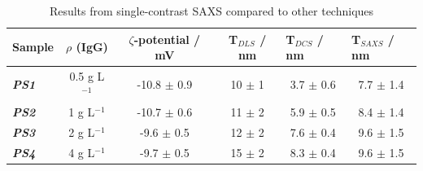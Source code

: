 \begin{table}[]
\centering
\caption{Results from single-contrast SAXS compared to other techniques}
\label{my-label}
\begin{tabular}{|l|c|c|c|c|c|}
\hline
\multicolumn{1}{|c|}{\textbf{Sample}} & \textbf{$\rho$ (IgG) } & \textbf{$\zeta$-potential / mV} & \textbf{T$_{DLS}$ / nm} & \multicolumn{1}{l|}{\textbf{T$_{DCS}$ / nm}} & \multicolumn{1}{l|}{\textbf{T$_{SAXS}$ / nm}} \\ \hline
\textit{\textbf{PS1}}                 & 0.5 g L$^{-1}$                      & -10.8 $\pm$ 0.9                  & 10 $\pm$ 1              & 3.7 $\pm$ 0.6                                & 7.7 $\pm$ 1.4                                 \\ \hline
\textit{\textbf{PS2}}                 & 1 g L$^{-1}$                        & -10.7 $\pm$ 0.6                  & 11 $\pm$ 2              & 5.9 $\pm$ 0.5                                & 8.4 $\pm$ 1.4                                 \\ \hline
\textit{\textbf{PS3}}                 & 2 g L$^{-1}$                        & -9.6 $\pm$ 0.5                   & 12 $\pm$ 2              & 7.6 $\pm$ 0.4                                & 9.6 $\pm$ 1.5                                 \\ \hline
\textit{\textbf{PS4}}                 & 4 g L$^{-1}$                        & -9.7 $\pm$ 0.5                   & 15 $\pm$ 2              & 8.3 $\pm$ 0.4                                & 9.6 $\pm$ 1.5                                 \\ \hline
\end{tabular}
\end{table}



